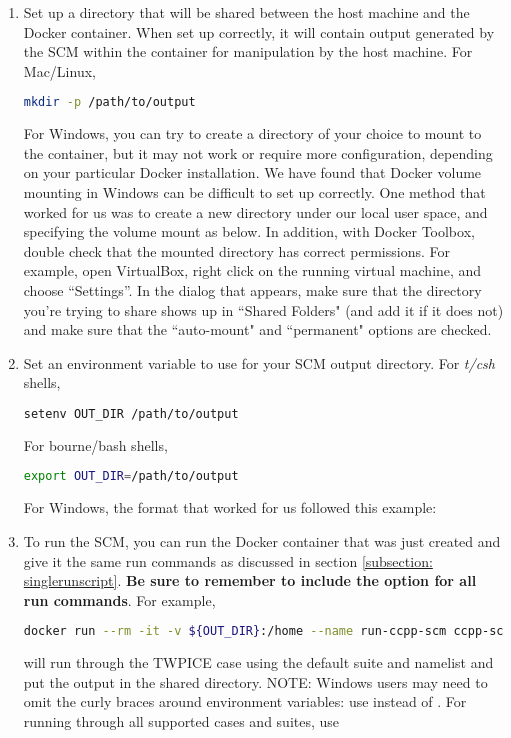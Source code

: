 \begin{enumerate}
\item Set up a directory that will be shared between the host machine and the Docker container. When set up correctly, it will contain output generated by the SCM within the container for manipulation by the host machine. For Mac/Linux,
\begin{lstlisting}[language=bash]
mkdir -p /path/to/output
\end{lstlisting}
For Windows, you can try to create a directory of your choice to mount to the container, but it may not work or require more configuration, depending on your particular Docker installation. We have found that Docker volume mounting in Windows can be difficult to set up correctly. One method that worked for us was to create a new directory under our local user space, and specifying the volume mount as below. In addition, with Docker Toolbox, double check that the mounted directory has correct permissions. For example, open VirtualBox, right click on the running virtual machine, and choose ``Settings''. In the dialog that appears, make sure that the directory you're trying to share shows up in ``Shared Folders" (and add it if it does not) and make sure that the ``auto-mount" and ``permanent" options are checked.
\item Set an environment variable to use for your SCM output directory. For \textit{t/csh} shells,
\begin{lstlisting}[language=bash]
setenv OUT_DIR /path/to/output
\end{lstlisting}
For bourne/bash shells,
\begin{lstlisting}[language=bash]
export OUT_DIR=/path/to/output
\end{lstlisting}
For Windows, the format that worked for us followed this example: 
\item To run the SCM, you can run the Docker container that was just created and give it the same run commands as discussed in section \ref{subsection: singlerunscript}. \textbf{Be sure to remember to include the  option for all run commands}. For example,
\begin{lstlisting}[language=bash]
docker run --rm -it -v ${OUT_DIR}:/home --name run-ccpp-scm ccpp-scm ./run_scm.py -c twpice -d
\end{lstlisting}
will run through the TWPICE case using the default suite and namelist and put the output in the shared directory. NOTE: Windows users may need to omit the curly braces around environment variables: use  instead of . For running through all supported cases and suites, use

\end{enumerate}
